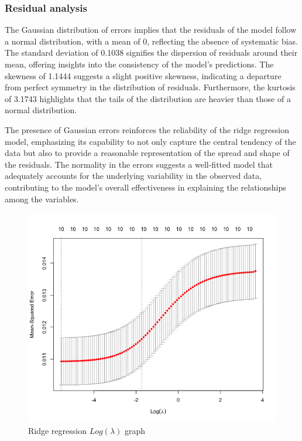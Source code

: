 \documentclass[10pt]{article} %
\begin{document}
    \subsubsection{Residual analysis}
    The Gaussian distribution of errors implies that the residuals of the model follow a normal distribution, with a mean of 0, reflecting the absence of systematic bias. The standard deviation of 0.1038 signifies the dispersion of residuals around their mean, offering insights into the consistency of the model's predictions. The skewness of 1.1444 suggests a slight positive skewness, indicating a departure from perfect symmetry in the distribution of residuals. Furthermore, the kurtosis of 3.1743 highlights that the tails of the distribution are heavier than those of a normal distribution.
    
    The presence of Gaussian errors reinforces the reliability of the ridge regression model, emphasizing its capability to not only capture the central tendency of the data but also to provide a reasonable representation of the spread and shape of the residuals. The normality in the errors suggests a well-fitted model that adequately accounts for the underlying variability in the observed data, contributing to the model's overall effectiveness in explaining the relationships among the variables.


    \begin{figure}[h]
        \centering
        \includegraphics[scale=0.45]{Assets/Ridge.png}
        \caption{Ridge regression $Log(\lambda)$ graph}
        \label{fig:ridge-results}
    \end{figure}
\end{document}
